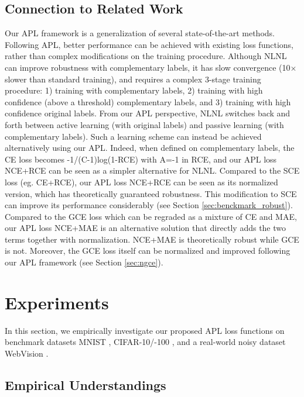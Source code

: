 \documentclass{article}
\begin{document}
\subsection{Connection to Related Work}
Our APL framework is a generalization of several state-of-the-art methods. Following APL, better performance can be achieved with existing loss functions, rather than complex modifications on the training procedure.
Although NLNL \cite{kim2019nlnl} can improve robustness with complementary labels, it has slow convergence (10$\times$ slower than standard training), and requires a complex 3-stage training procedure: 1) training with complementary labels, 2) training with high confidence (above a threshold) complementary labels, and 3) training with high confidence original labels. From our APL perspective, NLNL switches back and forth between active learning (with original labels) and passive learning (with complementary labels). Such a learning scheme can instead be achieved alternatively using our APL. 
Indeed, when defined on complementary labels, the CE loss becomes -1/(C-1)log(1-RCE) with A=-1 in RCE, and our APL loss NCE+RCE can be seen as a simpler alternative for NLNL.
Compared to the SCE \cite{wang2019symmetric} loss (eg. CE+RCE), our APL loss NCE+RCE can be seen as its normalized version, which has theoretically guaranteed robustness. This modification to SCE can improve its performance considerably (see Section \ref{sec:benckmark_robust}).
Compared to the GCE loss \cite{zhang2018generalized} which can be regraded as a mixture of CE and MAE, our APL loss NCE+MAE is an alternative solution that directly adds the two terms together with normalization. NCE+MAE is theoretically robust while GCE is not. Moreover, the GCE loss itself can be normalized and improved following our APL framework (see Section \ref{sec:ngce}).

\section{Experiments}\label{sec:experiments}
In this section, we empirically investigate our proposed APL loss functions on benchmark datasets MNIST \cite{lecun1998gradient}, CIFAR-10/-100
\cite{krizhevsky2009learning}, and a real-world noisy dataset WebVision \cite{li2017webvision}.


\subsection{Empirical Understandings}\label{sec:understanding}
\end{document}
